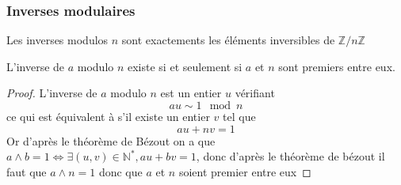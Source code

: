 \documentclass[11pt,colorlinks]{book}
\theoremstyle{mytheoremstyle}
\theoremstyle{mytheoremstyle}
\theoremstyle{mytheoremstyle}
\theoremstyle{mytheoremstyle}
\theoremstyle{mytheoremstyle}
\theoremstyle{mytheoremstyle}
\theoremstyle{mytheoremstyle}
\theoremstyle{mytheoremstyle}
\theoremstyle{myproblemstyle}
\def\mbb#1{\mathbb{#1}}
\def\bN{\mbb{N}}
\def\bZ{\mbb{Z}}
\renewcommand{\equiv}{\sim}
\begin{document}
\subsubsection{Inverses modulaires}
\begin{definition}
  Les inverses modulos $n$ sont exactements les éléments inversibles de $\bZ/n\bZ$
\end{definition}
\begin{prop}
  L'inverse de $a$ modulo $n$ existe si et seulement si $a$ et $n$ sont premiers entre eux.
  \begin{proof}
    L'inverse de $a$ modulo $n$ est un entier $u$ vérifiant 
    \begin{equation*}
      au \equiv 1 \mod n
    \end{equation*}
    ce qui est équivalent à s'il existe un entier $v$ tel que 
    \begin{equation*}
      au + nv = 1
    \end{equation*}
    Or d'après le théorème de Bézout on a que $a \wedge b = 1 \Leftrightarrow \exists (u,v) \in \bN^*, au + bv = 1$,
    donc d'après le théorème de bézout il faut que $a \wedge n = 1$ donc que $a$ et $n$ soient premier entre eux
  \end{proof}
\end{prop}
\end{document}
